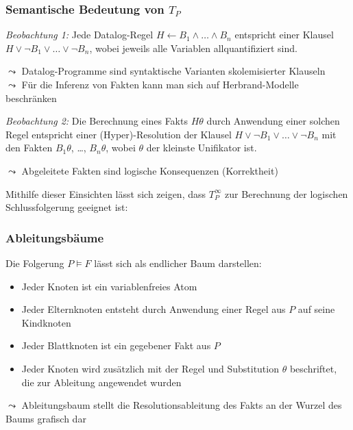 \documentclass[aspectratio=1610,onlymath]{beamer}
\begin{document}
\begin{frame}\frametitle{Semantische Bedeutung von $T_P$}

\emph{Beobachtung 1:} Jede Datalog-Regel $H\leftarrow B_1\wedge\ldots\wedge B_n$ entspricht einer
Klausel $H\vee\neg B_1\vee\ldots\vee\neg B_n$, wobei jeweils alle Variablen allquantifiziert sind.
\medskip\pause

$\leadsto$ Datalog-Programme sind syntaktische Varianten skolemisierter Klauseln\\
$\leadsto$ Für die Inferenz von Fakten kann man sich auf Herbrand-Modelle beschränken\bigskip\pause

\emph{Beobachtung 2:} Die Berechnung eines Fakts $H\theta$ durch Anwendung einer solchen Regel entspricht einer (Hyper)-Resolution der Klausel $H\vee\neg B_1\vee\ldots\vee\neg B_n$ mit den Fakten $B_1\theta$, \ldots, $B_n\theta$, wobei $\theta$ der kleinste Unifikator ist.\medskip\pause

$\leadsto$ Abgeleitete Fakten sind logische Konsequenzen (Korrektheit)\bigskip\pause

Mithilfe dieser Einsichten lässt sich zeigen, dass $T_P^\infty$ zur Berechnung der logischen Schlussfolgerung geeignet ist:


\end{frame}

\begin{frame}\frametitle{Ableitungsbäume}

Die Folgerung $P\models F$ lässt sich als endlicher Baum darstellen:
\begin{itemize}
\item Jeder Knoten ist ein variablenfreies Atom
\item Jeder Elternknoten entsteht durch Anwendung einer Regel aus $P$ auf seine Kindknoten
\item Jeder Blattknoten ist ein gegebener Fakt aus $P$
\item Jeder Knoten wird zusätzlich mit der Regel und Substitution $\theta$ beschriftet, die zur Ableitung angewendet wurden
\end{itemize}
$\leadsto$ Ableitungsbaum stellt die Resolutionsableitung des Fakts an der Wurzel des Baums grafisch dar
\bigskip


\end{frame}
\end{document}
